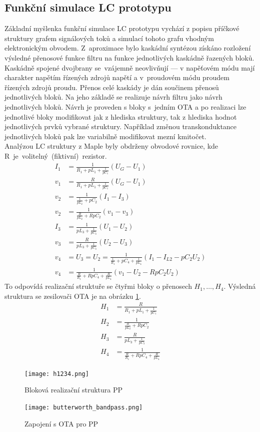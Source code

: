 \subsection{Funkční simulace LC prototypu}\label{s:KASK2}
\noindent Základní myšlenka funkční simulace LC prototypu vychází z popisu příčkové struktury grafem signálových toků a simulací tohoto grafu vhodným elektronickým obvodem. Z~aproximace bylo kaskádní syntézou získáno rozložení výsledné přenosové funkce filtru na funkce jednotlivých kaskádně řazených bloků. Kaskádně spojené dvojbrany se~vzájemně neovlivňují --- v napěťovém módu mají charakter napětím řízených zdrojů napětí a v~proudovém módu proudem řízených zdrojů proudu. Přenos celé kaskády je dán součinem přenosů jednotlivých bloků. Na jeho základě se realizuje návrh filtru jako návrh jednotlivých bloků. Návrh je proveden s bloky s~jedním OTA a po realizaci lze jednotlivé bloky modifikovat jak z hlediska struktury, tak z hlediska hodnot jednotlivých prvků vybrané struktury. Například změnou transkonduktance jednotlivých bloků pak lze variabilně modifikovat mezní kmitočet.\\
\newpage
\noindent Analýzou LC struktury z Maple byly obdrženy obvodové rovnice, kde R~je~volitelný~(fiktivní)~rezistor.
\begin{align}
I_1 &= \frac{1}{R_1 + pL_1 + \frac{1}{pC_1}}(U_G - U_1)\\
v_1 & = \frac{R}{R_1 + pL_1 + \frac{1}{pC_1}}(U_G - U_1)\\
v_2 &= \frac{1}{\frac{1}{pL_2} + pC_2}(I_1 - I_{3})\\
v_2 &= \frac{1}{\frac{R}{pL_2} + RpC_2}(v_1 - v_{3})\\
I_{3} &= \frac{1}{pL_3 + \frac{1}{pC_3}}(U_1 - U_2)\\
v_{3} &= \frac{R}{pL_3 + \frac{1}{pC_3}}(U_2 - U_3)\\
v_4 &= U_3 = U_2 = \frac{1}{\frac{1}{R_z}+pC_4 + \frac{1}{pL_4}}(I_1 - I_{L2} - pC_2U_2)\\
v_4 &= \frac{1}{\frac{R}{R_z}+RpC_4 + \frac{R}{pL_4}}(v_1 - U_2 - RpC_2 U_2)
\end{align}
\noindent To odpovídá realizační struktuře se čtyřmi bloky o přenosech $H_1, \ldots,H_4$. Výsledná struktura se zesilovači OTA je na obrázku \ref{s:OBR}.
\begin{align}
H_1 & = \frac{R}{R_1 + pL_1 + \frac{1}{pC_1}}\\
H_2 &= \frac{1}{\frac{R}{pL_2} + RpC_2}\\
H_3 &= \frac{R}{pL_3 + \frac{1}{pC_3}}\\
H_4 &= \frac{1}{\frac{R}{R_z}+RpC_4 + \frac{R}{pL_4}}
\end{align}
\begin{figure}[h]
\centering
\texttt{[image: h1234.png]}
\caption{Bloková realizační struktura PP}
\end{figure}
\begin{figure}[h]
\centering
\texttt{[image: butterworth\_bandpass.png]}
\caption{Zapojení s OTA pro PP\label{s:OBR}}
\end{figure}
\newpage
